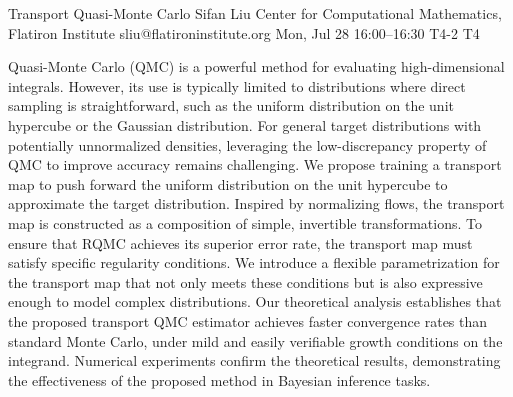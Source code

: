 \begin{talk}
  {Transport Quasi-Monte Carlo}%
  {Sifan Liu}%
  {Center for Computational Mathematics, Flatiron Institute}%
  {sliu@flatironinstitute.org}%
  {}%
  {}%
  {Mon, Jul 28 16:00--16:30}%
  {T4-2}%
  {T4}%
  {}%
  
    
   
Quasi-Monte Carlo (QMC) is a powerful method for evaluating high-dimensional integrals. However, its use is typically limited to distributions where direct sampling is straightforward, such as the uniform distribution on the unit hypercube or the Gaussian distribution. For general target distributions with potentially unnormalized densities, leveraging the low-discrepancy property of QMC to improve accuracy remains challenging. We propose training a transport map to push forward the uniform distribution on the unit hypercube to approximate the target distribution. Inspired by normalizing flows, the transport map is constructed as a composition of simple, invertible transformations. To ensure that RQMC achieves its superior error rate, the transport map must satisfy specific regularity conditions. We introduce a flexible parametrization for the transport map that not only meets these conditions but is also expressive enough to model complex distributions. Our theoretical analysis establishes that the proposed transport QMC estimator achieves faster convergence rates than standard Monte Carlo, under mild and easily verifiable growth conditions on the integrand. Numerical experiments confirm the theoretical results, demonstrating the effectiveness of the proposed method in Bayesian inference tasks.


\medskip


\end{talk}

